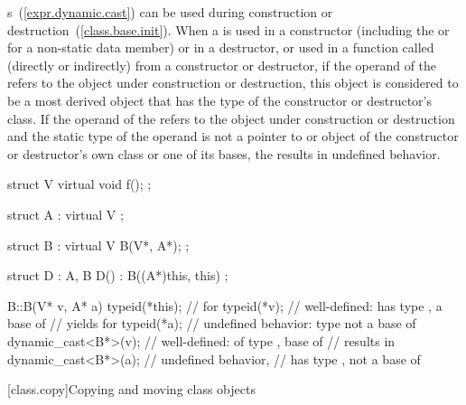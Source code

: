 \pnum
{}%
%
%
%
s~(\ref{expr.dynamic.cast}) can be used during construction
or destruction~(\ref{class.base.init}). When a
is used in a constructor (including the
 or 
for a non-static data member)
or in a destructor, or used in a function called (directly or indirectly) from
a constructor or destructor, if the operand of the
refers to the object under construction or destruction, this object is
considered to be a most derived object that has the type of the constructor or
destructor's class.
If the operand of the
refers to the object under construction or destruction and the static type of
the operand is not a pointer to or object of the constructor or destructor's
own class or one of its bases, the
results in undefined behavior.

\enterexample

\begin{codeblock}
struct V {
  virtual void f();
};

struct A : virtual V { };

struct B : virtual V {
  B(V*, A*);
};

struct D : A, B {
  D() : B((A*)this, this) { }
};

B::B(V* v, A* a) {
  typeid(*this);                //  for 
  typeid(*v);                   // well-defined:  has type , a base of 
                                // yields  for 
  typeid(*a);                   // undefined behavior: type  not a base of 
  dynamic_cast<B*>(v);          // well-defined:  of type ,  base of 
                                // results in 
  dynamic_cast<B*>(a);          // undefined behavior,
                                //  has type ,  not a base of 
}
\end{codeblock}
\exitexample%
%

[class.copy]{Copying and moving class objects}%
%
%
%
%
%

